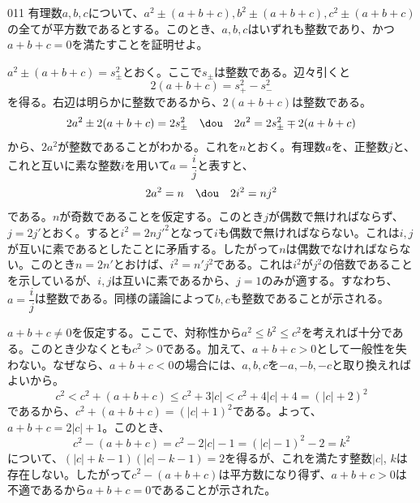 \begin{prob}{011}{}{}
 有理数$a,b,c$について、$a^2\pm (a+b+c), b^2\pm (a+b+c), c^2\pm (a+b+c)$の全てが平方数であるとする。このとき、$a,b,c$はいずれも整数であり、かつ$a+b+c=0$を満たすことを証明せよ。
\end{prob}
$a^2\pm (a+b+c)=s_\pm^2$とおく。ここで$s_\pm$は整数である。辺々引くと
\[ 2(a+b+c)=s_+^2-s_-^2 \]
を得る。右辺は明らかに整数であるから、$2(a+b+c)$は整数である。
\[ 2a^2\pm 2(a+b+c)=2s_\pm^2 \quad\dou\quad 2a^2=2s_\pm^2\mp 2(a+b+c) \]
から、$2a^2$が整数であることがわかる。これを$n$とおく。有理数$a$を、正整数$j$と、これと互いに素な整数$i$を用いて$a=\dfrac{i}{j}$と表すと、
\[ 2a^2=n \quad\dou\quad 2i^2=nj^2 \]
である。$n$が奇数であることを仮定する。このとき$j$が偶数で無ければならず、$j=2j'$とおく。すると$i^2=2nj'^2$となって$i$も偶数で無ければならない。これは$i, j$が互いに素であるとしたことに矛盾する。したがって$n$は偶数でなければならない。このとき$n=2n'$とおけば、$i^2=n'j^2$である。これは$i^2$が$j^2$の倍数であることを示しているが、$i, j$は互いに素であるから、$j=1$のみが適する。すなわち、$a=\dfrac{i}{j}$は整数である。同様の議論によって$b, c$も整数であることが示される。

$a+b+c\neq 0$を仮定する。ここで、対称性から$a^2\le b^2\le c^2$を考えれば十分である。このとき少なくとも$c^2>0$である。加えて、$a+b+c>0$として一般性を失わない。なぜなら、$a+b+c<0$の場合には、$a, b, c$を$-a, -b, -c$と取り換えればよいから。
\[ c^2 < c^2+(a+b+c) \le c^2+3|c| < c^2+4|c|+4=(|c|+2)^2 \]
であるから、$c^2+(a+b+c)=(|c|+1)^2$である。よって、$a+b+c=2|c|+1$。このとき、
\[ c^2-(a+b+c)=c^2-2|c|-1=(|c|-1)^2-2=k^2 \]
について、$(|c|+k-1)(|c|-k-1)=2$を得るが、これを満たす整数$|c|$, $k$は存在しない。したがって$c^2-(a+b+c)$は平方数になり得ず、$a+b+c>0$は不適であるから$a+b+c=0$であることが示された。
